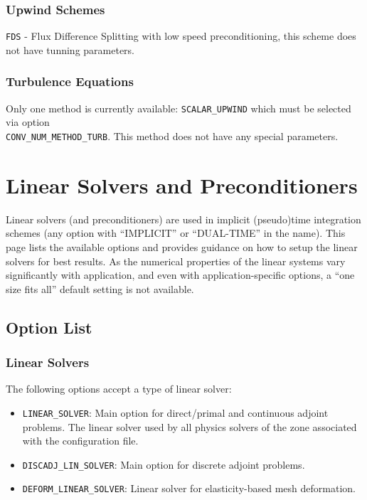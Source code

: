 \documentclass{article}
\begin{document}
\subsubsection{Upwind Schemes}

\verb|FDS| - Flux Difference Splitting with low speed preconditioning, this scheme does not have tunning parameters.

\subsubsection{Turbulence Equations}

Only one method is currently available: \verb|SCALAR_UPWIND| which must be selected via option \\ \verb|CONV_NUM_METHOD_TURB|. This method does not have any special parameters.




\newpage
\section{Linear Solvers and Preconditioners}
Linear solvers (and preconditioners) are used in implicit (pseudo)time integration schemes (any option with “IMPLICIT” or “DUAL-TIME” in the name). This page lists the available options and provides guidance on how to setup the linear solvers for best results. As the numerical properties of the linear systems vary significantly with application, and even with application-specific options, a “one size fits all” default setting is not available.

\subsection{Option List}
\subsubsection{Linear Solvers}
The following options accept a type of linear solver:

\begin{itemize}
    \item \verb|LINEAR_SOLVER|: Main option for direct/primal and continuous adjoint problems. The linear solver used by all physics solvers of the zone associated with the configuration file.
    \item \verb|DISCADJ_LIN_SOLVER|: Main option for discrete adjoint problems.
    \item \verb|DEFORM_LINEAR_SOLVER|: Linear solver for elasticity-based mesh deformation.
    
\end{itemize}
\end{document}
